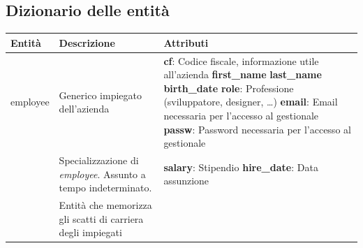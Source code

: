 \subsection{Dizionario delle entità}
\begin{longtable}{@{}| p{} | p{} | p{} |}
	\hline
	Entità               & Descrizione                                                                                            & Attributi \\
	\hline
	employee             & \begin{minipage}[t]{0.4\textwidth}
		                       \raggedright
		                       Generico impiegato dell'azienda
	                       \end{minipage}
	                     & \begin{minipage}[t]{0.3\textwidth}
		                       \raggedright
		                       \textbf{cf}: Codice fiscale, informazione utile all'azienda\sskip
		                       \textbf{first\_name} \sskip
		                       \textbf{last\_name} \sskip
		                       \textbf{birth\_date} \sskip
		                       \textbf{role}: Professione (sviluppatore, designer, \dots)\sskip
		                       \textbf{email}: Email necessaria per l'accesso al gestionale\sskip
		                       \textbf{passw}: Password necessaria per l'accesso al gestionale
	                       \end{minipage}                                                  \\[140pt]
	\hline
	\baseemp             & \begin{minipage}[t]{0.4\textwidth}
		                       \raggedright
		                       Specializzazione di \textit{employee}. Assunto a tempo indeterminato.
	                       \end{minipage}
	                     & \begin{minipage}[t]{0.3\textwidth}
		                       \raggedright
		                       \textbf{salary}: Stipendio\sskip
		                       \textbf{hire\_date}: Data assunzione
	                       \end{minipage}                                                                                \\[20pt]
	\hline
	\careerlog           & \begin{minipage}[t]{0.4\textwidth}
		                       \raggedright
		                       Entità che memorizza gli scatti di carriera degli impiegati \textit{\baseemp}

\end{minipage}
\end{longtable}
